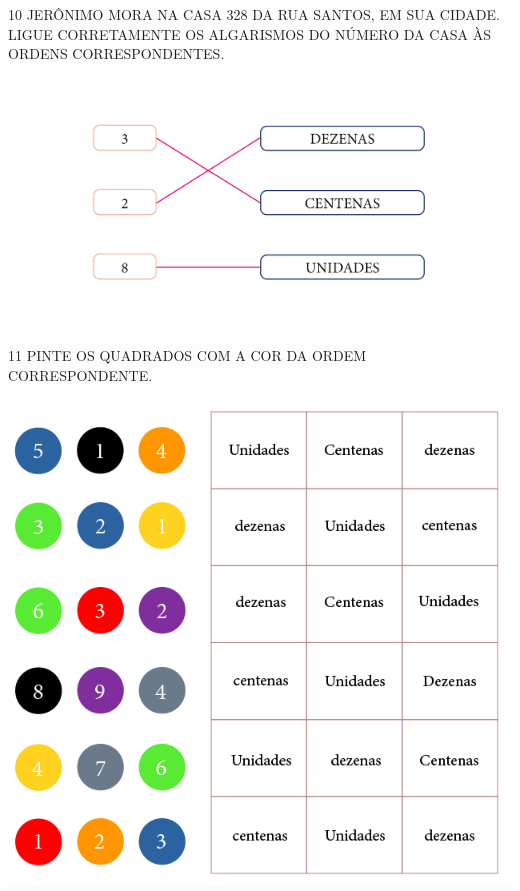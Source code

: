\num{10} JERÔNIMO MORA NA CASA 328 DA RUA SANTOS, EM SUA
CIDADE. LIGUE CORRETAMENTE OS ALGARISMOS DO NÚMERO DA CASA ÀS ORDENS
CORRESPONDENTES.

\begin{figure}[htpb!]
\centering
\includegraphics[width=.5\textwidth]{../ilustracoes/MAT1/SAEB_1ANO_MAT_FIGURA10.png}
\end{figure}

\num{11} PINTE OS QUADRADOS COM A COR DA ORDEM CORRESPONDENTE.


\begin{minipage}{.8\textwidth}
\includegraphics[width=\textwidth]{../ilustracoes/MAT1/SAEB_1ANO_MAT_FIGURA11.png}
\end{minipage}\hspace*{-1cm}

